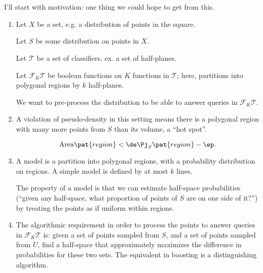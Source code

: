 \section{}




I'll start with motivation: one thing we could hope to get from this.

\begin{enumerate}
\item
Let $X$ be a set, e.g. a distribution of points in the square. %

Let $S$ be some distribution on points in $X$.


Let $\mathcal T$ be a set of classifiers, ex. a set of half-planes.

Let $\mathcal F_K\mathcal T$ be boolean functions on $K$ functions in $\mathcal T$; here, partitions into polygonal regions by $k$ half-planes.

We want to pre-process the distribution to be able to answer queries in $\mathcal F_K\mathcal T$.
\item
A violation of pseudo-density in this setting means there is a polygonal region with many more points from $S$ than its volume, a ``hot spot''.



$$
\text{Area}\pat{region}< \de \Pj_S\pat{region}-\ep.
$$
\item
A model is a partition into polygonal regions, with a probability distribution on regions. A simple model is defined by at most $k$ lines. 

The property of a model is that we can estimate half-space probabilities (``given any half-space, what proportion of points of $S$ are on one side of it?'') by treating the points as if uniform within regions.


\item
The algorithmic requirement in order to process the points to answer queries in $\mathcal F_K\mathcal T$ is:  given a set of points sampled from $S$, and a set of points sampled from $U$, find a half-space that approximately maximizes the difference in probabilities for these two sets. The equivalent in boosting is a distinguishing algorithm.
\end{enumerate}
